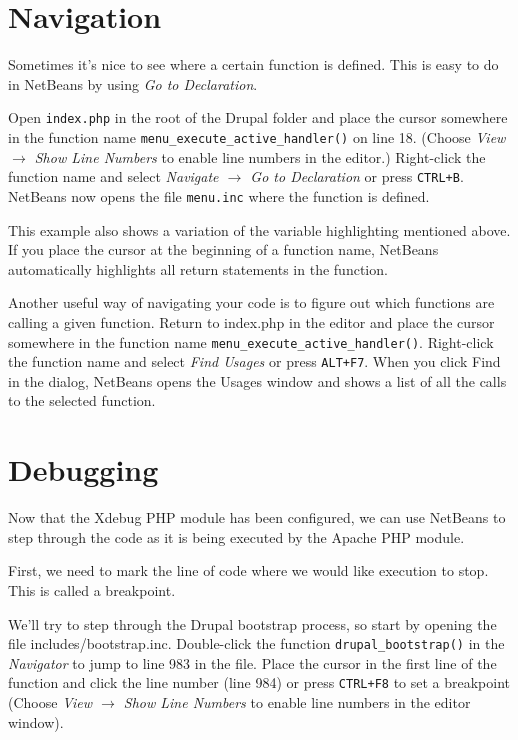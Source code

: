 \documentclass[final,ebook,10pt,twoside,openright]{memoir}
\begin{document}
\section{Navigation}

Sometimes it’s nice to see where a certain function is defined. This is easy to do in NetBeans by using \emph{Go to Declaration}.

Open \verb!index.php! in the root of the Drupal folder and place the cursor somewhere in the function name \verb!menu_execute_active_handler()! on line 18. (Choose \emph{View $\rightarrow$ Show Line Numbers} to enable line numbers in the editor.) Right-click the function name and select \emph{Navigate $\rightarrow$ Go to Declaration} or press \verb!CTRL+B!. NetBeans now opens the file \verb!menu.inc! where the function is defined.

This example also shows a variation of the variable highlighting mentioned above. If you place the cursor at the beginning of a function name, NetBeans automatically highlights all return statements in the function.

Another useful way of navigating your code is to figure out which functions are calling a given function. Return to index.php in the editor and place the cursor somewhere in the function name \verb!menu_execute_active_handler()!. Right-click the function name and select \emph{Find Usages} or press \verb!ALT+F7!. When you click Find in the dialog, NetBeans opens the Usages window and shows a list of all the calls to the selected function.


\section{Debugging}

Now that the Xdebug PHP module has been configured, we can use NetBeans to step through the code as it is being executed by the Apache PHP module.

First, we need to mark the line of code where we would like execution to stop. This is called a breakpoint.

We’ll try to step through the Drupal bootstrap process, so start by opening the file includes/bootstrap.inc. Double-click the function \verb!drupal_bootstrap()! in the \emph{Navigator} to jump to line 983 in the file. Place the cursor in the first line of the function and click the line number (line 984) or press \verb!CTRL+F8! to set a breakpoint (Choose \emph{View $\rightarrow$ Show Line Numbers} to enable line numbers in the editor window).
\end{document}

